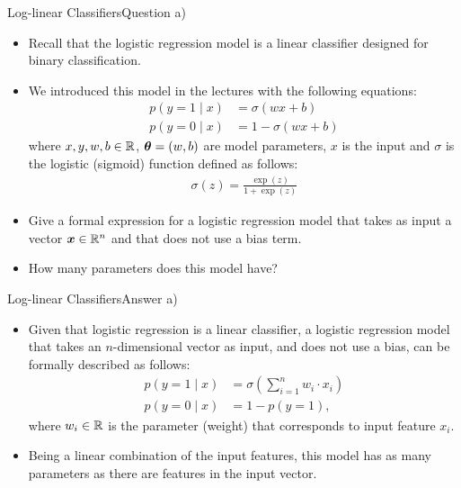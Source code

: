 \documentclass[t]{beamer}
\begin{document}
\begin{frame}{Log-linear Classifiers}{Question a)}
    \begin{itemize}
        \item Recall that the logistic regression model is a linear classifier
              designed for binary classification.
        \item We introduced this model in the
              lectures with the following equations:
              \begin{align}
                  p(y=1\mid x) & = \sigma(w x + b)     \\
                  p(y=0\mid x) & = 1 - \sigma(w x + b)
              \end{align}
              where $x,y,w,b\in\mathbb{R}$, ${\boldsymbol{\theta}}=(w,b)$ are model parameters,
              $x$ is the input and $\sigma$ is the logistic (sigmoid) function
              defined as follows:
              \begin{align}\label{eq:sigmoid}
                  \sigma(z) = \frac{\exp{(z)}}{1 + \exp{(z)}}
              \end{align}
        \item Give a formal expression for a logistic regression model that
              takes as input a vector ${\boldsymbol{x}}\in\mathbb{R}^n$ and that does not use a
              bias term.
        \item How many parameters does this model have?
    \end{itemize}
\end{frame}

\begin{frame}{Log-linear Classifiers}{Answer a)}
    \begin{itemize}
        \item Given that logistic regression is a linear classifier, a logistic
              regression model that takes an $n$-dimensional vector as input,
              and does not use a bias, can be formally described as follows:
              \begin{align}
                  p(y=1\mid x) & = \sigma\left(\sum_{i=1}^{n}w_i\cdot x_i\right) \\
                  p(y=0\mid x) & = 1-p(y=1),
              \end{align}
              where $w_i\in\mathbb{R}$ is the parameter (weight) that corresponds to
              input feature $x_i$.
        \item Being a linear combination of the input features, this model has
              as many parameters as there are features in the input vector.
    \end{itemize}
\end{frame}
\end{document}
